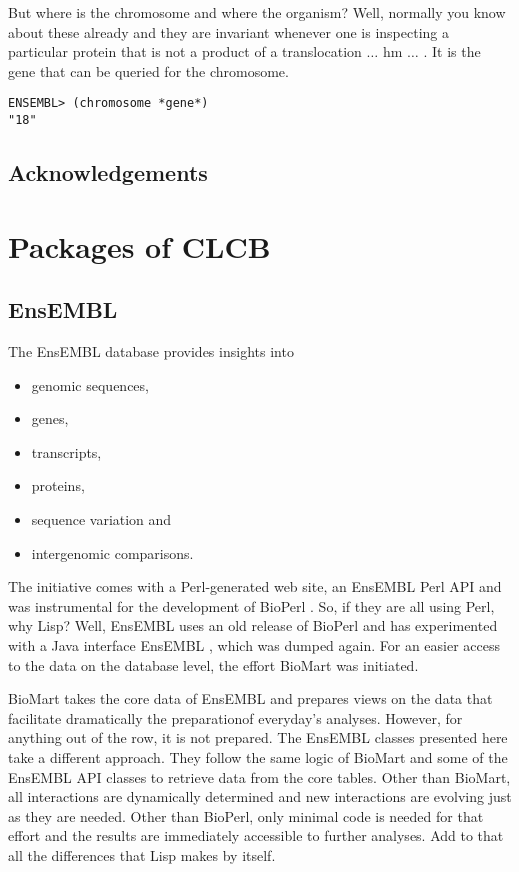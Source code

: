 \documentclass{book}
\newcommand\ensembl{EnsEMBL }
\newcommand\CLCB{CLCB }
\begin{document}
But where is the chromosome
and where the organism? Well, normally you know about these already and they
are invariant whenever one is inspecting a particular protein that is not
a product of a translocation $\ldots$ hm $\ldots$ . It is the gene that can
be queried for the chromosome.

\begin{lstlisting}
ENSEMBL> (chromosome *gene*)
"18"
\end{lstlisting}

\section{Acknowledgements}



\chapter{Packages of \CLCB}

\section{\ensembl}

The \ensembl database provides insights into 
\begin{itemize}
\item genomic sequences,
\item genes,
\item transcripts,
\item proteins,
\item sequence variation and
\item intergenomic comparisons.
\end{itemize}
The initiative comes with a Perl-generated web site, an \ensembl Perl
API and was instrumental for the development of BioPerl \cite{bioperl:2002}. So, if they
are all using Perl, why Lisp? Well, \ensembl uses an old release of
BioPerl and has experimented with a Java interface \ensembl, which was
dumped again. For an easier access to the data on the database level,
the effort BioMart was initiated.

BioMart takes the core data of \ensembl and prepares views on the data that
facilitate dramatically the preparationof everyday's analyses. However,
for anything out of the row, it is not prepared. The \ensembl classes
presented here take a different approach. They follow the same logic of
BioMart and some of the \ensembl API classes to retrieve data from the core
tables. Other than BioMart, all interactions are dynamically determined
and new interactions are evolving just as they are needed. Other than
BioPerl, only minimal code is needed for that effort and the results
are immediately accessible to further analyses. Add to that all the
differences that Lisp makes by itself.
\end{document}
